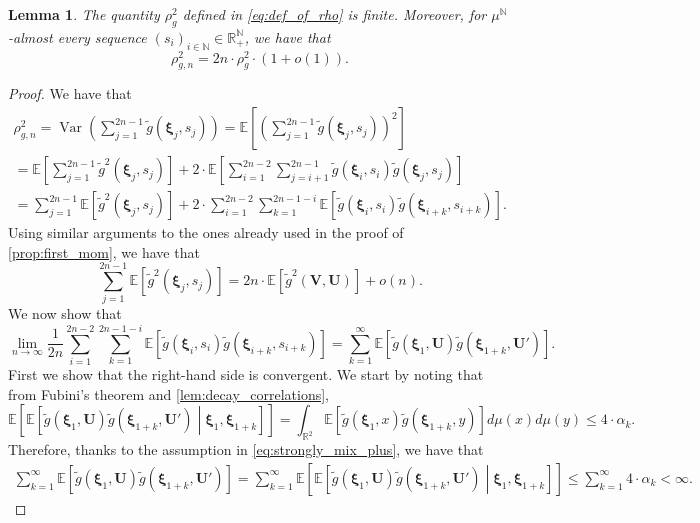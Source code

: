 \documentclass[11pt,a4paper,oneside]{article}
\newtheorem{lem}[thm]{Lemma}
\theoremstyle{definition}
\theoremstyle{remark}
\def\N{\mathbb{N}}
\def\E{\mathbb{E}}
\def\R{\mathbb{R}}
\DeclareMathOperator{\Var}{Var}
\begin{document}
\begin{lem} \label{lem:variance_is_linear}
The quantity $\rho_g^2$ defined in \cref{eq:def_of_rho} is finite. Moreover, for $\mu^{\N}$-almost every sequence $(s_i)_{{i\in\N}}\in\R^{\N}_{+}$, we have that 
	\begin{equation} \label{eq:asympt_for_var}
\rho_{g,n}^2 = 2n\cdot \rho_g^2 \cdot (1+o(1)).
\end{equation}
\end{lem}
\begin{proof}
	We have that
	\begin{multline}
	\rho_{g,n}^2 =	\Var \left( \sum_{j=1}^{2n-1}\tilde{g} \left(\bm \xi_j,s_j\right) \right) 
		= \E \left[ \left( \sum_{j=1}^{2n-1}\tilde{g} \left(\bm \xi_j,s_j\right) \right)^2  \right] \\
		 = \E \left[  \sum_{j=1}^{2n-1}\tilde{g}^2 \left(\bm \xi_j,s_j\right)  \right] 
		 +2\cdot  \E \left[ \sum_{i=1}^{2n-2} \sum_{j=i+1}^{2n-1}  \tilde{g} \left(\bm \xi_i,s_i\right) \tilde{g} \left(\bm \xi_j,s_j\right)  \right] \\
		  = \sum_{j=1}^{2n-1}  \E \left[ \tilde{g}^2 \left(\bm \xi_j,s_j\right)  \right]  
		 + 2\cdot \sum_{i=1}^{2n-2} \sum_{k=1}^{2n-1 -i} \E \left[  \tilde{g} \left(\bm \xi_i,s_i\right) \tilde{g} \left(\bm \xi_{i+k},s_{i+k}\right)  \right].
	\end{multline}
	Using similar arguments to the ones already used in the proof of \cref{prop:first_mom}, we have that 
 	\begin{equation}\label{eq:fibiwfwofnbew}
		\sum_{j=1}^{2n-1}  \E \left[\tilde{g}^2 \left(\bm \xi_j,s_j\right)  \right]  = 2n \cdot  \E \left[ \tilde{g}^2  (\bm V, \bm U) \right] + o(n) .
	\end{equation}
	We now show that 
	\begin{equation}\label{eq:wfejbbfweqibfdwequobfd}
	\lim_{n\to \infty} \frac{1}{2n} \sum_{i=1}^{2n-2} \sum_{k=1}^{2n-1 -i} \E \left[  \tilde{g} \left(\bm \xi_i,s_i\right) \tilde{g} \left(\bm \xi_{i+k},s_{i+k}\right)  \right]  =	\sum_{k=1}^{\infty} \E\left[ \tilde{g} (\bm{\xi}_1, \bm U) \tilde{g}  (\bm{\xi}_{1+k}, \bm U') \right].
	\end{equation}
	First we show that the right-hand side is convergent. We start by noting that from Fubini's theorem and \cref{lem:decay_correlations},
	$$ \E \left[\E \left[ \tilde{g} (\bm{\xi}_1, \bm U) \tilde{g}  (\bm{\xi}_{1+k}, \bm U') \middle| \bm{\xi}_1, \bm{\xi}_{1+k} \right]\right] =\int_{\R^2} \E \left[\tilde{g} (\bm{\xi}_1, x) \tilde{g}  (\bm{\xi}_{1+k}, y)\right]  d\mu(x) d\mu(y)\leq 4\cdot \alpha_k.$$
	Therefore, thanks to  the assumption in \cref{eq:strongly_mix_plus}, we have that
	\begin{multline}\label{eq:bnd_with_alpha}
		\sum_{k=1}^{\infty} \E\left[ \tilde{g} (\bm{\xi}_1, \bm U) \tilde{g}  (\bm{\xi}_{1+k}, \bm U') \right] =	\sum_{k=1}^{\infty} \E\left[ \E \left[ \tilde{g} (\bm{\xi}_1, \bm U) \tilde{g}  (\bm{\xi}_{1+k}, \bm U') \middle| \bm{\xi}_1, \bm{\xi}_{1+k} \right] \right] 
		\leq \sum_{k=1}^{\infty} 4 \cdot \alpha_k < \infty.
	\end{multline}  
	

\end{proof}
\end{document}
